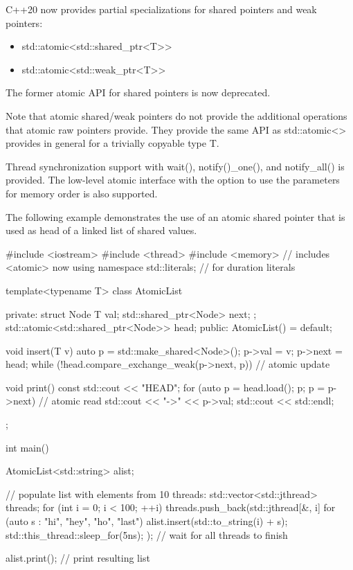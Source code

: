 C++20 now provides partial specializations for shared pointers and weak pointers:

\begin{itemize}
\item 
std::atomic<std::shared\_ptr<T>{}>

\item 
std::atomic<std::weak\_ptr<T>{}>
\end{itemize}

The former atomic API for shared pointers is now deprecated.

Note that atomic shared/weak pointers do not provide the additional operations that atomic raw pointers provide. They provide the same API as std::atomic<> provides in general for a trivially copyable type T.

Thread synchronization support with wait(), notify()\_one(), and notify\_all() is provided. The low-level atomic interface with the option to use the parameters for memory order is also supported.


The following example demonstrates the use of an atomic shared pointer that is used as head of a linked list of shared values.


\begin{cpp}
#include <iostream>
#include <thread>
#include <memory> // includes <atomic> now
using namespace std::literals; // for duration literals

template<typename T>
class AtomicList {
	private:
	struct Node {
		T val;
		std::shared_ptr<Node> next;
	};
	std::atomic<std::shared_ptr<Node>> head;
public:
	AtomicList() = default;
	
	void insert(T v) {
		auto p = std::make_shared<Node>();
		p->val = v;
		p->next = head;
		while (!head.compare_exchange_weak(p->next, p)) { // atomic update
		}
	}
	
	void print() const {
		std::cout << "HEAD";
		for (auto p = head.load(); p; p = p->next) { // atomic read
			std::cout << "->" << p->val;
		}
		std::cout << std::endl;
	}
};

int main()
{
	AtomicList<std::string> alist;
	
	// populate list with elements from 10 threads:
	{
		std::vector<std::jthread> threads;
		for (int i = 0; i < 100; ++i) {
			threads.push_back(std::jthread{[&, i]{
					for (auto s : {"hi", "hey", "ho", "last"}) {
						alist.insert(std::to_string(i) + s);
						std::this_thread::sleep_for(5ns);
					}
			}});
		}
	} // wait for all threads to finish
	
	alist.print(); // print resulting list
	}
\end{cpp}

